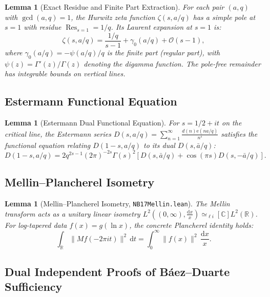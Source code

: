 \documentclass[11pt,a4paper]{article}
\theoremstyle{plain}
\newtheorem{lemma}[theorem]{Lemma}
\theoremstyle{definition}
\theoremstyle{remark}
\newcommand{\e}{\mathrm{e}}
\newcommand{\diff}{\mathrm{d}}
\begin{document}
\begin{lemma}[Exact Residue and Finite Part Extraction]
For each pair $(a, q)$ with $\gcd(a, q) = 1$, the Hurwitz zeta function $\zeta(s, a/q)$ has a simple pole at $s=1$ with residue $\operatorname{Res}_{s=1} = 1/q$. Its Laurent expansion at $s=1$ is:
\[
\zeta(s, a/q) = \frac{1/q}{s-1} + \gamma_0(a/q) + \mathcal{O}(s-1),
\]
where $\gamma_0(a/q) = -\psi(a/q)/q$ is the finite part (regular part), with $\psi(z) = \Gamma'(z)/\Gamma(z)$ denoting the digamma function. The pole-free remainder has integrable bounds on vertical lines.
\end{lemma}

\subsection{Estermann Functional Equation}

\begin{lemma}[Estermann Dual Functional Equation]
For $s = 1/2 + it$ on the critical line, the Estermann series $D(s, a/q) = \sum_{n=1}^\infty \frac{d(n) \e(na/q)}{n^s}$ satisfies the functional equation relating $D(1-s, a/q)$ to its dual $D(s, \bar{a}/q)$:
\[
D(1-s, a/q) = 2q^{2s-1}(2\pi)^{-2s}\Gamma(s)^2 \left[ D(s, \bar{a}/q) + \cos(\pi s) D(s, -\bar{a}/q) \right].
\]
\end{lemma}

\subsection{Mellin--Plancherel Isometry}

\begin{lemma}[Mellin--Plancherel Isometry, \texttt{NB17Mellin.lean}]
The Mellin transform acts as a unitary linear isometry $L^2((0,\infty), \frac{\diff x}{x}) \simeq_{\ell i}[\mathbb{C}] L^2(\mathbb{R})$. For log-tapered data $f(x) = g(\ln x)$, the concrete Plancherel identity holds:
\[
\int_{\mathbb{R}} \|M f(-2\pi it)\|^2 \,\diff t = \int_{0}^{\infty} \|f(x)\|^2 \,\frac{\diff x}{x}.
\]
\end{lemma}

\subsection{Dual Independent Proofs of Báez--Duarte Sufficiency}
\end{document}
